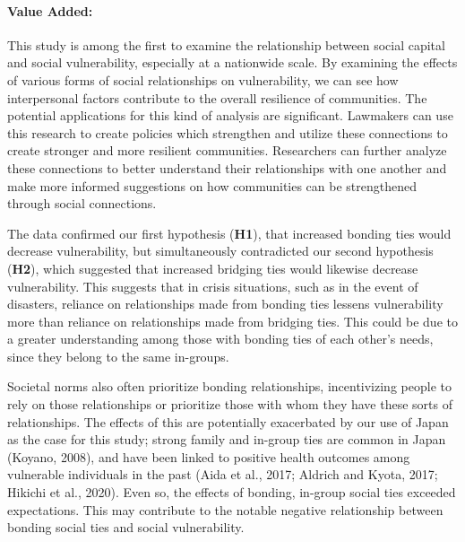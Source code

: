 \documentclass[]{elsarticle} %
\begin{document}
\hypertarget{value-added}{%
\paragraph{Value Added:}\label{value-added}}

This study is among the first to examine the relationship between social
capital and social vulnerability, especially at a nationwide scale. By
examining the effects of various forms of social relationships on
vulnerability, we can see how interpersonal factors contribute to the
overall resilience of communities. The potential applications for this
kind of analysis are significant. Lawmakers can use this research to
create policies which strengthen and utilize these connections to create
stronger and more resilient communities. Researchers can further analyze
these connections to better understand their relationships with one
another and make more informed suggestions on how communities can be
strengthened through social connections.

The data confirmed our first hypothesis (\textbf{H1}), that increased
bonding ties would decrease vulnerability, but simultaneously
contradicted our second hypothesis (\textbf{H2}), which suggested that
increased bridging ties would likewise decrease vulnerability. This
suggests that in crisis situations, such as in the event of disasters,
reliance on relationships made from bonding ties lessens vulnerability
more than reliance on relationships made from bridging ties. This could
be due to a greater understanding among those with bonding ties of each
other's needs, since they belong to the same in-groups.

Societal norms also often prioritize bonding relationships,
incentivizing people to rely on those relationships or prioritize those
with whom they have these sorts of relationships. The effects of this
are potentially exacerbated by our use of Japan as the case for this
study; strong family and in-group ties are common in Japan (Koyano,
2008), and have been linked to positive health outcomes among vulnerable
individuals in the past (Aida et al., 2017; Aldrich and Kyota, 2017;
Hikichi et al., 2020). Even so, the effects of bonding, in-group social
ties exceeded expectations. This may contribute to the notable negative
relationship between bonding social ties and social vulnerability.
\end{document}
